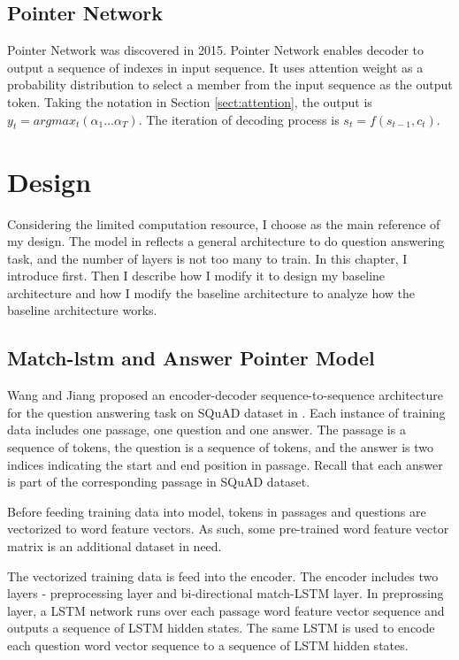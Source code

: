 \documentclass[modernstyle,12pt]{sjsuthesis}
\theoremstyle{definition}
\begin{document}
\section{Pointer Network}\label{sect:pointerNet}

Pointer Network\cite{vinyals2015pointer} was discovered in 2015. Pointer Network enables decoder to output a sequence of indexes in input sequence. It uses attention weight as a probability distribution to select a member from the input sequence as the output token. Taking the notation in Section \ref{sect:attention}, the output is $y_t = argmax_t{(\alpha _1 ... \alpha _T)}$. The iteration of decoding process is $s_t =f(s_{t-1},c_t)$.




\chapter{Design}\label{chap:design}

Considering the limited computation resource, I choose \cite{wang2016machine} as the main reference of my design. The model in \cite{wang2016machine} reflects a general architecture to do question answering task, and the number of layers is not too many to train. In this chapter, I introduce \cite{wang2016machine} first. Then I describe how I modify it to design my baseline architecture and how I modify the baseline architecture to analyze how the baseline architecture works.


\section{Match-lstm and Answer Pointer Model}

Wang and Jiang  proposed an encoder-decoder sequence-to-sequence architecture for the question answering task on SQuAD dataset in \cite{wang2016machine}. Each instance of training data includes one passage, one question and one answer. The passage is a sequence of tokens, the question is a sequence of tokens, and the answer is two indices indicating the start and end position in passage. Recall that each answer is part of the corresponding passage in SQuAD dataset.

Before feeding training data into model, tokens in passages and questions are vectorized to word feature vectors. As such, some pre-trained word feature vector matrix is an additional dataset in need.

The vectorized training data is feed into the encoder. The encoder includes two layers - preprocessing layer and bi-directional match-LSTM layer. In preprossing layer, a LSTM network runs over each passage word feature vector sequence and outputs a sequence of LSTM hidden states. The same LSTM is used to encode each question word vector sequence to a sequence of LSTM hidden states.
\end{document}
